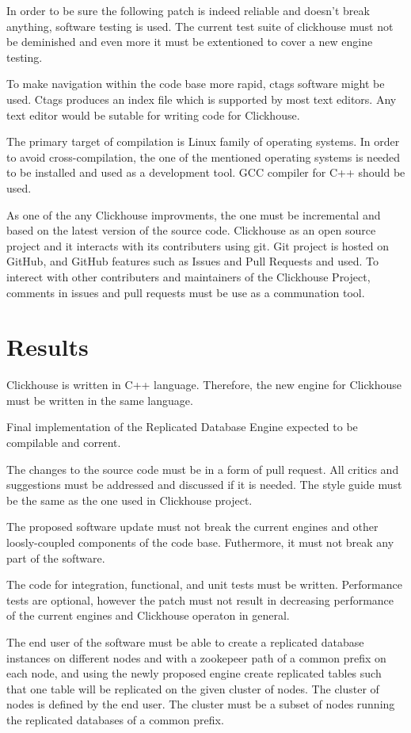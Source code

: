 \documentclass[conference]{IEEEtran}
\begin{document}
In order to be sure the following patch is indeed reliable and doesn't break anything,
software testing is used. The current test suite of clickhouse must not be
deminished and even more it must be extentioned to cover a new engine testing.

To make navigation within the code base more
rapid, ctags software might be used. Ctags produces an index file which is supported
by most text editors.
Any text editor would be sutable for writing code for Clickhouse.

The primary target of compilation is Linux family of operating systems.
In order to avoid cross-compilation, the one of the mentioned operating systems
is needed to be installed and used as a development tool. GCC compiler for C++ should be used.

As one of the any Clickhouse improvments, the one must be incremental and based
on the latest version of the source code. Clickhouse as an open source project and it
interacts with its contributers using git. Git project is hosted on GitHub, and
GitHub features such as Issues and Pull Requests and used. To interect with other
contributers and maintainers of the Clickhouse Project, comments in issues and
pull requests must be use as a communation tool.

\section{Results}
Clickhouse is written in C++ language. Therefore, the new engine for Clickhouse
must be written in the same language.

Final implementation of the Replicated Database Engine expected to be compilable
and corrent.

The changes to the source code must be in a form of pull request. All critics and suggestions
must be addressed and discussed if it is needed. The style guide must be the same as
the one used in Clickhouse project.

The proposed software update must not break the current engines and other loosly-coupled
components of the code base. Futhermore, it must not break any part of the software.

The code for integration, functional, and unit tests must be written.
Performance tests are optional, however the patch must not result in decreasing
performance of the current engines and Clickhouse operaton in general.

The end user of the software must be able to create a replicated
database instances on different nodes and with a zookepeer path of a common prefix
on each node, and using the newly proposed engine create replicated tables such that
one table will be replicated on the given cluster of nodes. The cluster of nodes
is defined by the end user. The cluster must be a subset of nodes running the replicated 
databases of a common prefix.
\end{document}
